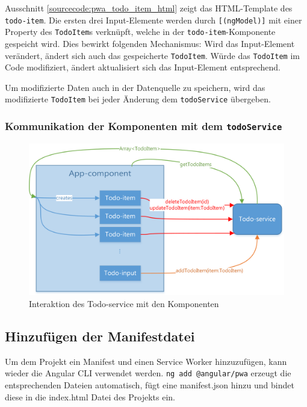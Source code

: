 \begin{description}
	Ausschnitt \ref{sourcecode:pwa_todo_item_html} zeigt das HTML-Template des \texttt{todo-item}. Die ersten drei Input-Elemente werden durch \texttt{[(ngModel)]} mit einer Property des \texttt{TodoItem}s verknüpft, welche in der \texttt{todo-item}-Komponente gespeicht wird. Dies bewirkt folgenden Mechanismus: Wird das Input-Element verändert, ändert sich auch das gespeicherte \texttt{TodoItem}. Würde das \texttt{TodoItem} im Code modifiziert, ändert aktualisiert sich das Input-Element entsprechend.
	
	Um modifizierte Daten auch in der Datenquelle zu speichern, wird das modifizierte \texttt{TodoItem} bei jeder Änderung dem \texttt{todoService} übergeben.
	
	
	
\end{description}

\subsubsection{Kommunikation der Komponenten mit dem \texttt{todoService}}



\begin{figure}[h]
	\includegraphics[width=\textwidth]{img/pwa_components.png}
	\centering
	\caption{Interaktion des Todo-service mit den Komponenten}
	\label{fig:pwa_todo_service}
\end{figure}


\subsection{Hinzufügen der Manifestdatei}
Um dem Projekt ein Manifest und einen Service Worker hinzuzufügen, kann wieder die Angular CLI verwendet werden. \texttt{ng add @angular/pwa} erzeugt die entsprechenden Dateien automatisch, fügt eine manifest.json hinzu und bindet diese in die index.html Datei des Projekts ein.

